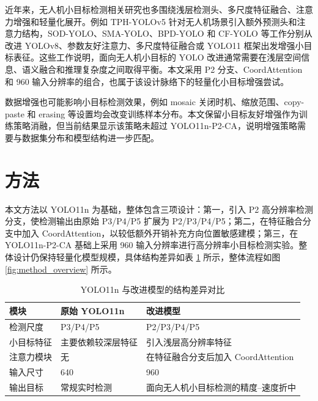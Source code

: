 \documentclass[UTF8,a4paper,10.5pt,fontset=windows]{ctexart}
\newcommand{\YOLOBase}{\mbox{YOLO11n}}
\newcommand{\YOLOPtwoCA}{\mbox{YOLO11n-P2-CA}}
\newcommand{\CoordAtt}{\mbox{CoordAttention}}
\begin{document}
近年来，无人机小目标检测相关研究也多围绕浅层检测头、多尺度特征融合、注意力增强和轻量化展开。例如 TPH-YOLOv5 针对无人机场景引入额外预测头和注意力结构，SOD-YOLO、SMA-YOLO、BPD-YOLO 和 CF-YOLO 等工作分别从改进 YOLOv8、参数友好注意力、多尺度特征融合或 YOLO11 框架出发增强小目标表征\cite{zhu2021tphyolov5,li2024sodyolo,qu2025smayolo,chao2025bpdyolo,wang2025cfyolo}。这些工作说明，面向无人机小目标的 YOLO 改进通常需要在浅层空间信息、语义融合和推理复杂度之间取得平衡。本文采用 P2 分支、\CoordAtt{} 和 960 输入分辨率的组合，也属于该设计脉络下的轻量化小目标增强尝试。

数据增强也可能影响小目标检测效果，例如 mosaic 关闭时机、缩放范围、copy-paste 和 erasing 等设置均会改变训练样本分布。本文保留小目标友好增强作为训练策略消融，但当前结果显示该策略未超过 \YOLOPtwoCA{}，说明增强策略需要与数据集分布和模型结构进一步匹配。

\section{方法}

本文方法以 \YOLOBase{} 为基础，整体包含三项设计：第一，引入 P2 高分辨率检测分支，使检测输出由原始 P3/P4/P5 扩展为 P2/P3/P4/P5；第二，在特征融合分支中加入 \CoordAtt{}，以较低额外开销补充方向位置敏感建模；第三，在 \YOLOPtwoCA{} 基础上采用 960 输入分辨率进行高分辨率小目标检测实验。整体设计仍保持轻量化模型规模，具体结构差异如表 \ref{tab:structure_diff} 所示，整体流程如图 \ref{fig:method_overview} 所示。

\begin{table}[htbp]
\centering
\caption{\YOLOBase{} 与改进模型的结构差异对比}
\label{tab:structure_diff}
\small
\begin{tabular}{p{}p{}p{}}
\toprule
模块 & 原始 \YOLOBase{} & 改进模型 \\
\midrule
检测尺度 & P3/P4/P5 & P2/P3/P4/P5 \\
小目标特征 & 主要依赖较深层特征 & 引入浅层高分辨率特征 \\
注意力模块 & 无 & 在特征融合分支后加入 \CoordAtt{} \\
输入尺寸 & 640 & 960 \\
输出目标 & 常规实时检测 & 面向无人机小目标检测的精度--速度折中 \\
\bottomrule
\end{tabular}
\end{table}
\end{document}
